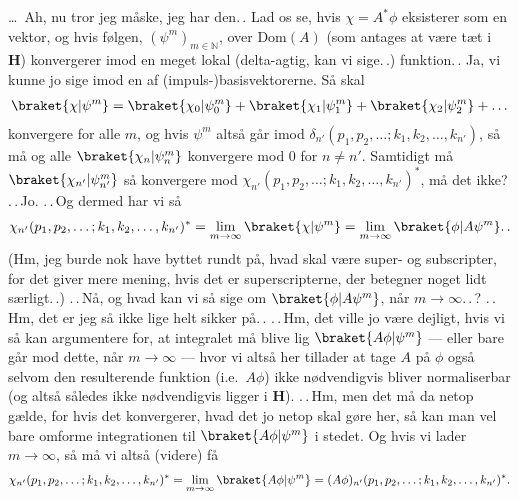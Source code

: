 \documentclass{report}
\begin{document}
\ldots\ Ah, nu tror jeg måske, jeg har den.\,. Lad os se, hvis $\chi = A^* \phi$ eksisterer som en vektor, og hvis følgen, $(\psi^m)_{m\in\mathbb{N}}$, over Dom$(A)$ (som antages at være tæt i \textbf{H}) konvergerer imod en meget lokal (delta-agtig, kan vi sige.\,.) funktion.\,. Ja, vi kunne jo sige imod en af (impuls-)basisvektorerne. Så skal 
\begin{align}
\begin{aligned}
	\braket{\chi | \psi^m} = 
		\braket{\chi_0 | \psi^m_0} +
		\braket{\chi_1 | \psi^m_1} +
		\braket{\chi_2 | \psi^m_2} +
		\ldots
\end{aligned}
\end{align}
konvergere for alle $m$, og hvis $\psi^m$ altså går imod $\delta_{n'}(p_1, p_2, \ldots; k_1, k_2, \ldots, k_{n'})$, så må og alle $\braket{\chi_n | \psi^m_n}$ konvergere mod 0 for $n \neq n'$. Samtidigt må $\braket{\chi_{n'} | \psi^m_{n'}}$ så konvergere mod $\chi_{n'}(p_1, p_2, \ldots; k_1, k_2, \ldots, k_{n'})^*$, må det ikke? .\,.\,Jo. .\,.\,Og dermed har vi så
\begin{align}
\begin{aligned}
	\chi_{n'}(p_1, p_2, \ldots; k_1, k_2, \ldots, k_{n'})^* = 
		\lim_{m\to\infty}\braket{\chi | \psi^m} = 
		\lim_{m\to\infty}\braket{\phi | A \psi^m}.\,.
\end{aligned}
\end{align}
(Hm, jeg burde nok have byttet rundt på, hvad skal være super- og subscripter, for det giver mere mening, hvis det er superscripterne, der betegner noget lidt særligt.\,.) .\,.\,Nå, og hvad kan vi så sige om $\braket{\phi | A \psi^m}$, når $m\to\infty$.\,.\,? .\,.\,Hm, det er jeg så ikke lige helt sikker på.\,. .\,.\,Hm, det ville jo være dejligt, hvis vi så kan argumentere for, at integralet må blive lig $\braket{A \phi | \psi^m}$ --- eller bare går mod dette, når $m\to\infty$ --- hvor vi altså her tillader at tage $A$ på $\phi$ også selvom den resulterende funktion (i.e.\ $A\phi$) ikke nødvendigvis bliver normaliserbar (og altså således ikke nødvendigvis ligger i \textbf{H}). .\,.\,Hm, men det må da netop gælde, for hvis det konvergerer, hvad det jo netop skal gøre her, så kan man vel bare omforme integrationen til $\braket{A \phi | \psi^m}$ i stedet. Og hvis vi lader $m\to\infty$, så må vi altså (videre) få
\begin{align}
\begin{aligned}
\chi_{n'}(p_1, p_2, \ldots; k_1, k_2, \ldots, k_{n'})^* = 
	\lim_{m\to\infty}\braket{A \phi | \psi^m} = 
	(A \phi)_{n'}(p_1, p_2, \ldots; k_1, k_2, \ldots, k_{n'})^*.
	\label{forkert1}%
\end{aligned}
\end{align}
\end{document}
